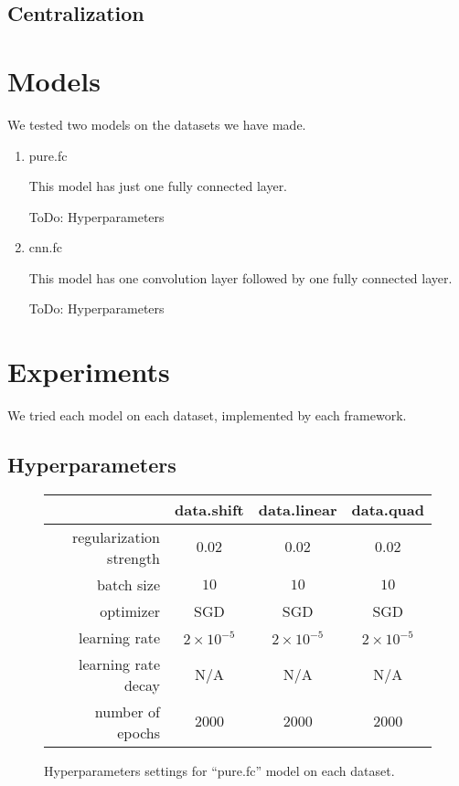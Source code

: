 \documentclass[a4paper]{article}
\begin{document}
\subsection{Centralization}

\section{Models}

We tested two models on the datasets we have made.
\begin{enumerate}
\item pure.fc

	This model has just one fully connected layer.

	ToDo: Hyperparameters

\item cnn.fc

	This model has one convolution layer followed by one fully connected layer.

	ToDo: Hyperparameters
\end{enumerate}

\section{Experiments}

We tried each model on each dataset, implemented by each framework.

\subsection{Hyperparameters}

\begin{figure}[H]
\centering
\begin{tabular}{|r|c|c|c|}
\hline
 & data.shift & data.linear & data.quad \\
\hline
regularization strength & $0.02$ & $0.02$ & $0.02$ \\
\hline
batch size & $10$ & $10$ & $10$ \\
\hline
optimizer & SGD & SGD & SGD \\
\hline
learning rate & $2\times10^{-5}$ & $2\times10^{-5}$ & $2\times10^{-5}$\\
\hline
learning rate decay & N/A & N/A & N/A \\
\hline
number of epochs & $2000$ & $2000$ & $2000$ \\
\hline
\end{tabular}
\caption{Hyperparameters settings for ``pure.fc'' model on each dataset.}
\end{figure}
\end{document}
